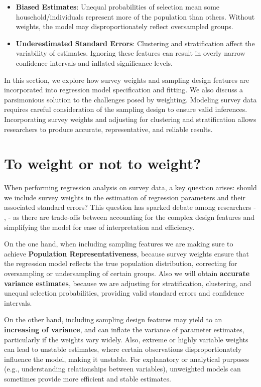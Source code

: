 \documentclass[
  12pt,
]{book}
\begin{document}
\begin{itemize}
\item
  \textbf{Biased Estimates}: Unequal probabilities of selection mean some household/individuals represent more of the population than others. Without weights, the model may disproportionately reflect oversampled groups.
\item
  \textbf{Underestimated Standard Errors}: Clustering and stratification affect the variability of estimates. Ignoring these features can result in overly narrow confidence intervals and inflated significance levels.
\end{itemize}

In this section, we explore how survey weights and sampling design features are incorporated into regression model specification and fitting. We also discuss a parsimonious solution to the challenges posed by weighting. Modeling survey data requires careful consideration of the sampling design to ensure valid inferences. Incorporating survey weights and adjusting for clustering and stratification allows researchers to produce accurate, representative, and reliable results.

\hypertarget{to-weight-or-not-to-weight}{%
\section{To weight or not to weight?}\label{to-weight-or-not-to-weight}}

When performing regression analysis on survey data, a key question arises: should we include survey weights in the estimation of regression parameters and their associated standard errors? This question has sparked debate among researchers - \citet{skinner1989analysis}, \citet{pfeffermann2011modelling} - as there are trade-offs between accounting for the complex design features and simplifying the model for ease of interpretation and efficiency.

On the one hand, when including sampling features we are making sure to achieve \textbf{Population Representativeness}, because survey weights ensure that the regression model reflects the true population distribution, correcting for oversampling or undersampling of certain groups. Also we will obtain \textbf{accurate variance estimates}, because we are adjusting for stratification, clustering, and unequal selection probabilities, providing valid standard errors and confidence intervals.

On the other hand, including sampling design features may yield to an \textbf{increasing of variance}, and can inflate the variance of parameter estimates, particularly if the weights vary widely. Also, extreme or highly variable weights can lead to unstable estimates, where certain observations disproportionately influence the model, making it unstable. For explanatory or analytical purposes (e.g., understanding relationships between variables), unweighted models can sometimes provide more efficient and stable estimates.
\end{document}
